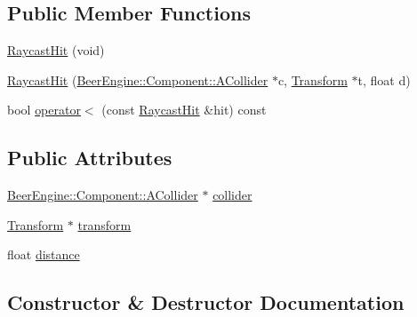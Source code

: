 \subsection*{Public Member Functions}
\begin{DoxyCompactItemize}
\item 
\mbox{\hyperlink{struct_beer_engine_1_1_physics_1_1_raycast_hit_a8395ce0eae1b9205fa860d9bf883329e}{Raycast\+Hit}} (void)
\item 
\mbox{\hyperlink{struct_beer_engine_1_1_physics_1_1_raycast_hit_a3a90e49816f4e619b4cdf863f9d0d285}{Raycast\+Hit}} (\mbox{\hyperlink{class_beer_engine_1_1_component_1_1_a_collider}{Beer\+Engine\+::\+Component\+::\+A\+Collider}} $\ast$c, \mbox{\hyperlink{class_beer_engine_1_1_transform}{Transform}} $\ast$t, float d)
\item 
bool \mbox{\hyperlink{struct_beer_engine_1_1_physics_1_1_raycast_hit_a985cc0a92cdc84779d87a28557c58a0d}{operator$<$}} (const \mbox{\hyperlink{struct_beer_engine_1_1_physics_1_1_raycast_hit}{Raycast\+Hit}} \&hit) const
\end{DoxyCompactItemize}
\subsection*{Public Attributes}
\begin{DoxyCompactItemize}
\item 
\mbox{\hyperlink{class_beer_engine_1_1_component_1_1_a_collider}{Beer\+Engine\+::\+Component\+::\+A\+Collider}} $\ast$ \mbox{\hyperlink{struct_beer_engine_1_1_physics_1_1_raycast_hit_a89dc9cb3b03c9c47d15a15e60e4be44a}{collider}}
\item 
\mbox{\hyperlink{class_beer_engine_1_1_transform}{Transform}} $\ast$ \mbox{\hyperlink{struct_beer_engine_1_1_physics_1_1_raycast_hit_aaf554d2ee6c3eb56b7af00d5a26ad006}{transform}}
\item 
float \mbox{\hyperlink{struct_beer_engine_1_1_physics_1_1_raycast_hit_aa417105761ef05052ea03b8f566c6c45}{distance}}
\end{DoxyCompactItemize}


\subsection{Constructor \& Destructor Documentation}
\mbox{\label{struct_beer_engine_1_1_physics_1_1_raycast_hit_a8395ce0eae1b9205fa860d9bf883329e}} 
